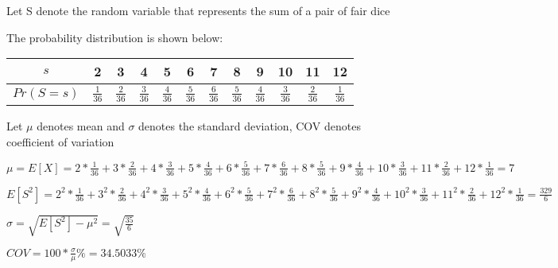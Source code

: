 \documentclass[12pt]{article}
\begin{document}
\begin{spacing}{2.0}
Let S denote the random variable that represents the sum of a pair of fair dice

The probability distribution is shown below:

\begin{tabular}{|c|c|c|c|c|c|c|c|c|c|c|c|}
  \hline
  $s$ & 2 & 3 & 4 & 5 & 6 & 7 & 8 & 9 & 10 & 11 & 12 \\
  \hline
  $Pr(S=s)$ & $\frac{1}{36}$ & $\frac{2}{36}$ & $\frac{3}{36}$ & $\frac{4}{36}$ & $\frac{5}{36}$ & $\frac{6}{36}$ & $\frac{5}{36}$ & $\frac{4}{36}$ & $\frac{3}{36}$ & $\frac{2}{36}$ & $\frac{1}{36}$ \\
  \hline
\end{tabular}

Let $\mu$ denotes mean and $\sigma$ denotes the standard deviation, COV denotes coefficient of variation

$\mu= E[X]= 2*\frac{1}{36} + 3*\frac{2}{36} + 4*\frac{3}{36} + 5*\frac{4}{36} +6*\frac{5}{36} + 7*\frac{6}{36}+ 8*\frac{5}{36}+ 9*\frac{4}{36}+ 10*\frac{3}{36} +11*\frac{2}{36} +12*\frac{1}{36} = 7$

$E[S^2]= 2^2*\frac{1}{36} + 3^2*\frac{2}{36} + 4^2*\frac{3}{36} + 5^2*\frac{4}{36} +6^2*\frac{5}{36} + 7^2*\frac{6}{36}+ 8^2*\frac{5}{36}+ 9^2*\frac{4}{36}+ 10^2*\frac{3}{36} +11^2*\frac{2}{36} +12^2*\frac{1}{36} = \frac{329}{6}$

$\sigma= \sqrt{E[S^2]- \mu^2}= \sqrt{\frac{35}{6}}$

$COV=100*\frac{\sigma}{\mu} \%=  34.5033 \%$


\end{spacing}
\end{document}
